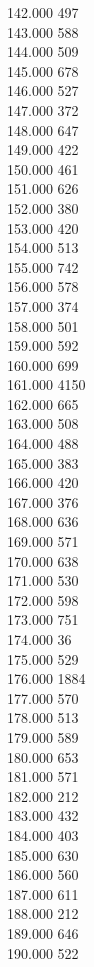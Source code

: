 { 142.000	497 \\
 143.000	588 \\
 144.000	509 \\
 145.000	678 \\
 146.000	527 \\
 147.000	372 \\
 148.000	647 \\
 149.000	422 \\
 150.000	461 \\
 151.000	626 \\
 152.000	380 \\
 153.000	420 \\
 154.000	513 \\
 155.000	742 \\
 156.000	578 \\
 157.000	374 \\
 158.000	501 \\
 159.000	592 \\
 160.000	699 \\
 161.000	4150 \\
 162.000	665 \\
 163.000	508 \\
 164.000	488 \\
 165.000	383 \\
 166.000	420 \\
 167.000	376 \\
 168.000	636 \\
 169.000	571 \\
 170.000	638 \\
 171.000	530 \\
 172.000	598 \\
 173.000	751 \\
 174.000	36 \\
 175.000	529 \\
 176.000	1884 \\
 177.000	570 \\
 178.000	513 \\
 179.000	589 \\
 180.000	653 \\
 181.000	571 \\
 182.000	212 \\
 183.000	432 \\
 184.000	403 \\
 185.000	630 \\
 186.000	560 \\
 187.000	611 \\
 188.000	212 \\
 189.000	646 \\
 190.000	522 \\
}
